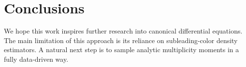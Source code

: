 \section{Conclusions}\label{sec:conclusions}

We hope this work inspires further research into canonical differential
equations. The main limitation of this approach is its reliance on
subleading-color density estimators. A natural next step is to sample
analytic multiplicity moments in a fully data-driven way.

